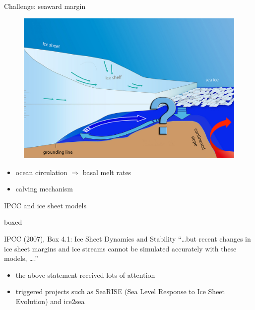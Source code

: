 \documentclass[hide notes,intlimits]{beamer}
\begin{document}
\begin{frame}{Challenge: seaward margin}
      \begin{figure}
        \includegraphics[width=.75\textwidth]{ice-shelf}
      \end{figure}
      \begin{itemize}
      \item ocean circulation $\Rightarrow$ basal melt rates
      \item calving mechanism
      \end{itemize}
\end{frame}


\begin{frame}{IPCC and ice sheet models}
  \begin{beamercolorbox}[rounded=true,shadow=true]{boxed}
    \begin{block}{IPCC (2007), Box 4.1: Ice Sheet Dynamics and Stability}
      ``\ldots but recent changes in ice sheet margins and ice streams cannot be simulated accurately with these models, \ldots.''
    \end{block}
  \end{beamercolorbox}
  \vspace{1em}
  \begin{itemize}
  \item the above statement received lots of attention
  \item triggered projects such as SeaRISE (Sea Level Response to Ice Sheet Evolution) and ice2sea
  \end{itemize}
\end{frame}
\end{document}
